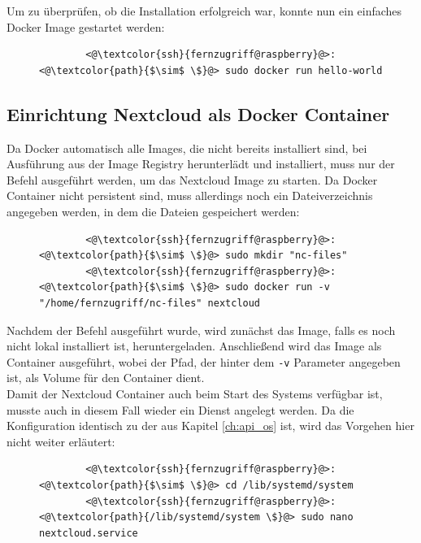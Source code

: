 \documentclass[a4paper, 11pt]{scrartcl}
\begin{document}
Um zu überprüfen, ob die Installation erfolgreich war, konnte nun ein einfaches Docker Image gestartet werden:
\begin{figure}[H]
    \begin{mdframed}[backgroundcolor=bbg]
        \begin{lstlisting}
        <@\textcolor{ssh}{fernzugriff@raspberry}@>:<@\textcolor{path}{$\sim$ \$}@> sudo docker run hello-world
        \end{lstlisting}
    \end{mdframed}
    \label{lst:setup_docker_repo}
\end{figure}


\subsection{Einrichtung Nextcloud als Docker Container}
Da Docker automatisch alle Images, die nicht bereits installiert sind, bei Ausführung aus der Image Registry herunterlädt und installiert, muss nur der Befehl ausgeführt werden,
um das Nextcloud Image zu starten. Da Docker Container nicht persistent sind, muss allerdings noch ein Dateiverzeichnis angegeben werden, in dem die Dateien gespeichert werden:
\begin{figure}[H]
    \begin{mdframed}[backgroundcolor=bbg]
        \begin{lstlisting}
        <@\textcolor{ssh}{fernzugriff@raspberry}@>:<@\textcolor{path}{$\sim$ \$}@> sudo mkdir "nc-files"
        <@\textcolor{ssh}{fernzugriff@raspberry}@>:<@\textcolor{path}{$\sim$ \$}@> sudo docker run -v "/home/fernzugriff/nc-files" nextcloud
        \end{lstlisting}
    \end{mdframed}
    \label{lst:folder_for_nextcloud}
\end{figure}
Nachdem der Befehl ausgeführt wurde, wird zunächst das Image, falls es noch nicht lokal installiert ist, heruntergeladen. Anschließend wird das Image als Container ausgeführt, wobei
der Pfad, der hinter dem \lstinline[basicstyle={\small\ttfamily\color{black}}]|-v| Parameter angegeben ist, als Volume für den Container dient.
\\
Damit der Nextcloud Container auch beim Start des Systems verfügbar ist, musste auch in diesem Fall wieder ein Dienst angelegt werden. Da die Konfiguration identisch zu der aus Kapitel
\ref{ch:api_os} ist, wird das Vorgehen hier nicht weiter erläutert:
\begin{figure}[H]
    \begin{mdframed}[backgroundcolor=bbg]
        \begin{lstlisting}
        <@\textcolor{ssh}{fernzugriff@raspberry}@>:<@\textcolor{path}{$\sim$ \$}@> cd /lib/systemd/system
        <@\textcolor{ssh}{fernzugriff@raspberry}@>:<@\textcolor{path}{/lib/systemd/system \$}@> sudo nano nextcloud.service
        \end{lstlisting}
    \end{mdframed}
    \label{lst:create_service_file_nextcloud}
\end{figure}
\end{document}

